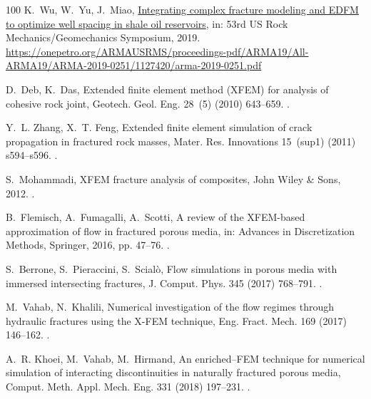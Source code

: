 \documentclass[3p,times]{elsarticle}
\theoremstyle{plain}
\begin{document}
\begin{thebibliography}{100}
K.~Wu, W.~Yu, J.~Miao,
  \href{https://onepetro.org/ARMAUSRMS/proceedings-pdf/ARMA19/All-ARMA19/ARMA-2019-0251/1127420/arma-2019-0251.pdf}{{Integrating
  complex fracture modeling and EDFM to optimize well spacing in shale oil
  reservoirs}}, in: 53rd US Rock Mechanics/Geomechanics Symposium, 2019.
\newline\urlprefix\url{https://onepetro.org/ARMAUSRMS/proceedings-pdf/ARMA19/All-ARMA19/ARMA-2019-0251/1127420/arma-2019-0251.pdf}

D.~Deb, K.~Das, {Extended finite element method (XFEM) for analysis of cohesive
  rock joint}, Geotech. Geol. Eng. 28~(5) (2010) 643--659.
\newblock \href {https://doi.org/10.1007/s10706-010-9323-7}
  {}.

Y.~L. Zhang, X.~T. Feng, {Extended finite element simulation of crack
  propagation in fractured rock masses}, Mater. Res. Innovations 15~(sup1)
  (2011) s594--s596.
\newblock \href {https://doi.org/10.1179/143307511X12858957677037}
  {}.

S.~Mohammadi, {XFEM fracture analysis of composites}, John Wiley \& Sons, 2012.
\newblock \href {https://doi.org/10.1002/9781118443378}
  {}.

B.~Flemisch, A.~Fumagalli, A.~Scotti, {A review of the XFEM-based approximation
  of flow in fractured porous media}, in: Advances in Discretization Methods,
  Springer, 2016, pp. 47--76.
\newblock \href {https://doi.org/10.1007/978-3-319-41246-7_3}
  {}.

S.~Berrone, S.~Pieraccini, S.~Scialò, Flow simulations in porous media with
  immersed intersecting fractures, J. Comput. Phys. 345 (2017) 768--791.
\newblock \href {https://doi.org/10.1016/j.jcp.2017.05.049}
  {}.

M.~Vahab, N.~Khalili, {Numerical investigation of the flow regimes through
  hydraulic fractures using the X-FEM technique}, Eng. Fract. Mech. 169 (2017)
  146--162.
\newblock \href {https://doi.org/10.1016/j.engfracmech.2016.11.017}
  {}.

A.~R. Khoei, M.~Vahab, M.~Hirmand, {An enriched--FEM technique for numerical
  simulation of interacting discontinuities in naturally fractured porous
  media}, Comput. Meth. Appl. Mech. Eng. 331 (2018) 197--231.
\newblock \href {https://doi.org/10.1016/j.cma.2017.11.016}
  {}.


\end{thebibliography}
\end{document}
